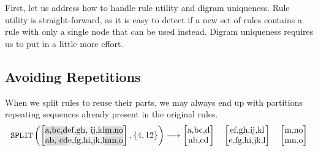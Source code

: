 \bigbreak%
First, let us address how to handle rule utility and digram uniqueness. Rule utility is straight-forward, as it is easy to detect if a new set of rules contains a rule with only a single node that can be used instead. Digram uniqueness requires us to put in a little more effort.

\subsection{Avoiding Repetitions}

When we split rules to reuse their parts, we may always end up with partitions repeating sequences already present in the original rules.
{
    \ttfamily
    \noindent
    \begin{align*}
        \texttt{SPLIT}\left(
        \begin{bmatrix}
            \text{\hlc{gray!30}{a,bc,d}\hlc{gray!10}{ef,gh, ij,kl}\hlc{gray!30}{m,no}}\\
            \text{\hlc{gray!30}{ab, cd}\hlc{gray!10}{e,fg,hi,jk,l}\hlc{gray!30}{mn,o}}
        \end{bmatrix}
        , \{4, 12\}
        \right)
        \longrightarrow
        \begin{bmatrix}
            \text{a,bc,d}\\
            \text{ab,cd}
        \end{bmatrix}
        \quad
        \begin{bmatrix}
            \text{ef,gh,ij,kl}\\
            \text{e,fg,hi,jk,l}
        \end{bmatrix}
        \quad
        \begin{bmatrix}
            \text{m,no}\\
            \text{mn,o}
        \end{bmatrix}
    \end{align*}
}

